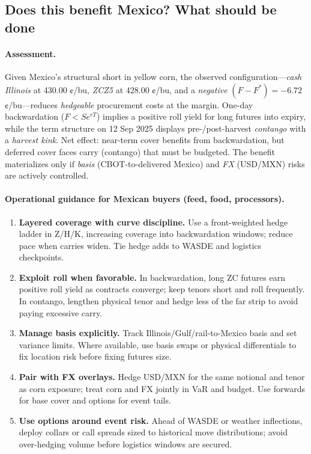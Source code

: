 \documentclass[10pt,a4paper]{article} %
\begin{document}
\subsection{Does this benefit Mexico? What should be done}

\paragraph{Assessment.}
Given Mexico’s structural short in yellow corn, the observed configuration—\emph{cash Illinois} at 430.00 ¢/bu, \emph{ZCZ5} at 428.00 ¢/bu, and a \emph{negative} \((F-F^{*})=-6.72\) ¢/bu—reduces \emph{hedgeable} procurement costs at the margin. One-day backwardation (\(F<S e^{rT}\)) implies a positive roll yield for long futures into expiry, while the term structure on 12 Sep 2025 displays pre-/post-harvest \emph{contango} with a \emph{harvest kink}. Net effect: near-term cover benefits from backwardation, but deferred cover faces carry (contango) that must be budgeted. The benefit materializes only if \emph{basis} (CBOT-to-delivered Mexico) and \emph{FX} (USD/MXN) risks are actively controlled.

\paragraph{Operational guidance for Mexican buyers (feed, food, processors).}
\begin{enumerate}
  \item \textbf{Layered coverage with curve discipline.} Use a front-weighted hedge ladder in Z/H/K, increasing coverage into backwardation windows; reduce pace when carries widen. Tie hedge adds to WASDE and logistics checkpoints.
  \item \textbf{Exploit roll when favorable.} In backwardation, long ZC futures earn positive roll yield as contracts converge; keep tenors short and roll frequently. In contango, lengthen physical tenor and hedge less of the far strip to avoid paying excessive carry.
  \item \textbf{Manage basis explicitly.} Track Illinois/Gulf/rail-to-Mexico basis and set variance limits. Where available, use basis swaps or physical differentials to fix location risk before fixing futures size.
  \item \textbf{Pair with FX overlays.} Hedge USD/MXN for the same notional and tenor as corn exposure; treat corn and FX jointly in VaR and budget. Use forwards for base cover and options for event tails.
  \item \textbf{Use options around event risk.} Ahead of WASDE or weather inflections, deploy collars or call spreads sized to historical move distributions; avoid over-hedging volume before logistics windows are secured.
\end{enumerate}
\end{document}
